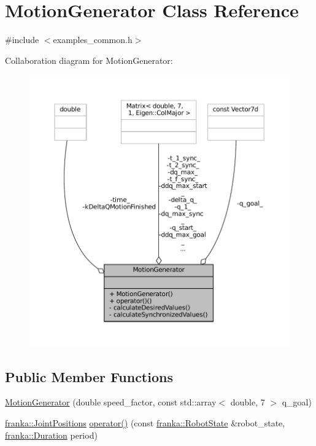 \hypertarget{classMotionGenerator}{}\section{Motion\+Generator Class Reference}
\label{classMotionGenerator}


{\ttfamily \#include $<$examples\+\_\+common.\+h$>$}



Collaboration diagram for Motion\+Generator\+:
\nopagebreak
\begin{figure}[H]
\begin{center}
\leavevmode
\includegraphics[width=350pt]{classMotionGenerator__coll__graph}
\end{center}
\end{figure}
\subsection*{Public Member Functions}
\begin{DoxyCompactItemize}
\item 
\hyperlink{classMotionGenerator_a23dd564a60401c539fb7f1bf63470894}{Motion\+Generator} (double speed\+\_\+factor, const std\+::array$<$ double, 7 $>$ q\+\_\+goal)
\item 
\hyperlink{classfranka_1_1JointPositions}{franka\+::\+Joint\+Positions} \hyperlink{classMotionGenerator_aefd763e7c31c54b56404f33d2295fda9}{operator()} (const \hyperlink{structfranka_1_1RobotState}{franka\+::\+Robot\+State} \&robot\+\_\+state, \hyperlink{classfranka_1_1Duration}{franka\+::\+Duration} period)
\end{DoxyCompactItemize}
